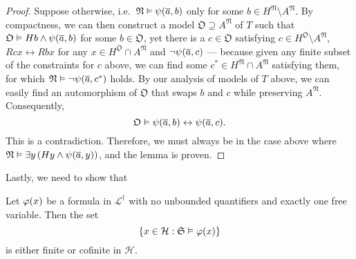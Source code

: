 \documentclass[11pt]{article}
\theoremstyle{plain}
\theoremstyle{definition}
\begin{document}
\begin{proof}
  Suppose otherwise, i.e.\ $\mathfrak{N} \vDash \psi\mleft(\overline{a}, b\mright)$ only for some $b \in H^\mathfrak{N} \setminus A^\mathfrak{N}$. By compactness, we can then construct a model $\mathfrak{O} \supseteq A^\mathfrak{N}$ of $T$ such that $\mathfrak{O} \vDash Hb \land \psi\mleft(\overline{a}, b\mright)$ for some $b \in \mathfrak{O}$, yet there is a $c \in \mathfrak{O}$ satisfying $c \in H^\mathfrak{O} \setminus A^\mathfrak{N}$, $Rcx \leftrightarrow Rbx$ for any $x \in H^\mathfrak{O} \cap A^\mathfrak{N}$ and $\neg \psi\mleft(\overline{a}, c\mright)$ --- because given any finite subset of the constraints for $c$ above, we can find some $c^* \in H^\mathfrak{N} \cap A^\mathfrak{N}$ satisfying them, for which $\mathfrak{N} \vDash \neg \psi\mleft(\overline{a}, c^*\mright)$ holds. By our analysis of models of $T$ above, we can easily find an automorphism of $\mathfrak{O}$ that swaps $b$ and $c$ while preserving $A^\mathfrak{N}$. Consequently,
  \[\mathfrak{O} \vDash \psi\mleft(\overline{a}, b\mright) \leftrightarrow \psi\mleft(\overline{a}, c\mright).\]
  This is a contradiction. Therefore, we must always be in the case above where $\mathfrak{N} \vDash \exists y \left(Hy \land \psi\mleft(\overline{a}, y\mright)\right)$, and the lemma is proven.
\end{proof}

Lastly, we need to show that

\begin{lemma}
  \label{lem:last}
  Let $\varphi\mleft(x\mright)$ be a formula in $\mathcal{L}^\dagger$ with no unbounded quantifiers and exactly one free variable. Then the set
  \[\left\{x \in \mathcal{H} : \mathfrak{S} \vDash \varphi\mleft(x\mright)\right\}\]
  is either finite or cofinite in $\mathcal{H}$.
\end{lemma}
\end{document}

